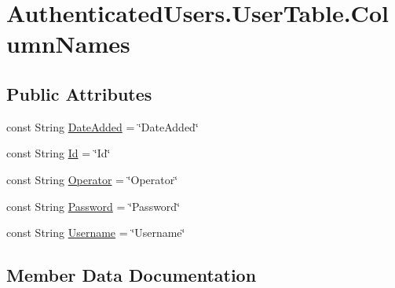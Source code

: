 \hypertarget{classOTA_1_1Data_1_1AuthenticatedUsers_1_1UserTable_1_1ColumnNames}{}\section{Authenticated\+Users.\+User\+Table.\+Column\+Names}
\label{classOTA_1_1Data_1_1AuthenticatedUsers_1_1UserTable_1_1ColumnNames}
\subsection*{Public Attributes}
\begin{DoxyCompactItemize}
\item 
const String \hyperlink{classOTA_1_1Data_1_1AuthenticatedUsers_1_1UserTable_1_1ColumnNames_adf1b1a1e767a24b1401e88d0a1cb8697}{Date\+Added} = \char`\"{}Date\+Added\char`\"{}
\item 
const String \hyperlink{classOTA_1_1Data_1_1AuthenticatedUsers_1_1UserTable_1_1ColumnNames_a2d48f49977fe14e69c0785f2574f8b1b}{Id} = \char`\"{}Id\char`\"{}
\item 
const String \hyperlink{classOTA_1_1Data_1_1AuthenticatedUsers_1_1UserTable_1_1ColumnNames_a5af99d8f0069aedc1c0e6bfeb5891c6c}{Operator} = \char`\"{}Operator\char`\"{}
\item 
const String \hyperlink{classOTA_1_1Data_1_1AuthenticatedUsers_1_1UserTable_1_1ColumnNames_acb13a5b49b296eb734f299ca7a90919c}{Password} = \char`\"{}Password\char`\"{}
\item 
const String \hyperlink{classOTA_1_1Data_1_1AuthenticatedUsers_1_1UserTable_1_1ColumnNames_a1ae44703cf04681ce1a04e0716b3461a}{Username} = \char`\"{}Username\char`\"{}
\end{DoxyCompactItemize}


\subsection{Member Data Documentation}
\hypertarget{classOTA_1_1Data_1_1AuthenticatedUsers_1_1UserTable_1_1ColumnNames_adf1b1a1e767a24b1401e88d0a1cb8697}{}
